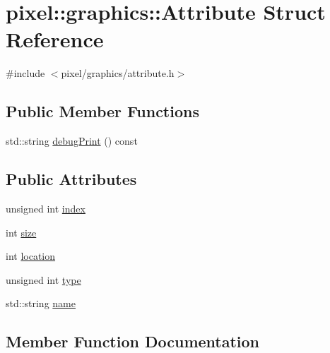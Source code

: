 \hypertarget{structpixel_1_1graphics_1_1_attribute}{}\section{pixel\+:\+:graphics\+:\+:Attribute Struct Reference}
\label{structpixel_1_1graphics_1_1_attribute}


{\ttfamily \#include $<$pixel/graphics/attribute.\+h$>$}

\subsection*{Public Member Functions}
\begin{DoxyCompactItemize}
\item 
std\+::string \hyperlink{structpixel_1_1graphics_1_1_attribute_abbf0a8cc12603b77f26dee1b841cdac8}{debug\+Print} () const
\end{DoxyCompactItemize}
\subsection*{Public Attributes}
\begin{DoxyCompactItemize}
\item 
unsigned int \hyperlink{structpixel_1_1graphics_1_1_attribute_ae0945b760635b2a95aa5620a638ebae8}{index}
\item 
int \hyperlink{structpixel_1_1graphics_1_1_attribute_a7657461b957ab3c74d3a6dc237f1581d}{size}
\item 
int \hyperlink{structpixel_1_1graphics_1_1_attribute_a4547040e98863207d138e265941781ef}{location}
\item 
unsigned int \hyperlink{structpixel_1_1graphics_1_1_attribute_a47a5857b9ac8a25c031e14e083afaf59}{type}
\item 
std\+::string \hyperlink{structpixel_1_1graphics_1_1_attribute_a8ebe8a0e5d3868da41d7c0c54163507c}{name}
\end{DoxyCompactItemize}


\subsection{Member Function Documentation}
\mbox{\label{structpixel_1_1graphics_1_1_attribute_abbf0a8cc12603b77f26dee1b841cdac8}} 
